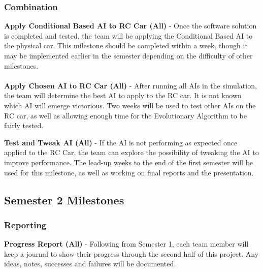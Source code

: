 \documentclass[8pt]{article}
\begin{document}
\subsubsection{Combination}

\textbf{Apply Conditional Based AI to RC Car (All)} - Once the software solution is completed and tested, the team will be applying the Conditional Based AI to the physical car. This milestone should be completed within a week, though it may be implemented earlier in the semester depending on the difficulty of other milestones.
\\\\
\textbf{Apply Chosen AI to RC Car (All)} - After running all AIs in the simulation, the team will determine the best AI to apply to the RC car. It is not known which AI will emerge victorious. Two weeks will be used to test other AIs on the RC car, as well as allowing enough time for the Evolutionary Algorithm to be fairly tested. 

\newpage


%
%
%

\textbf{Test and Tweak AI (All)} - If the AI is not performing as expected once applied to the RC Car, the team can explore the possibility of tweaking the AI to improve performance. The lead-up weeks to the end of the first semester will be used for this milestone, as well as working on final reports and the presentation.

\subsection{Semester 2 Milestones}


\subsubsection{Reporting}
\textbf{Progress Report (All)} - Following from Semester 1, each team member will keep a journal to show their progress through the second half of this project. Any ideas, notes, successes and failures will be documented.
\end{document}
